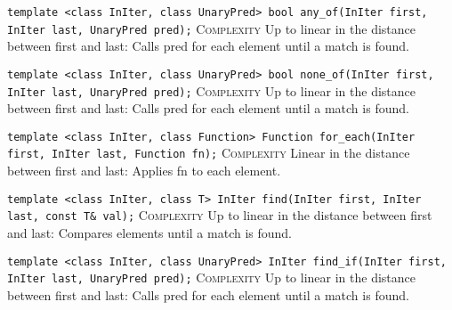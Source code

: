 \noindent{}\hspace*{0.25em}\lstinline[basicstyle=\ttfamily\color{corange}]{template <class InIter, class UnaryPred> bool any_of(InIter first, InIter last, UnaryPred pred);} \textsc{Complexity} Up to linear in the distance between first and last: Calls pred for each element until a match is found.\\\vspace{-0.6em}

\noindent{}\hspace*{0.25em}\lstinline[basicstyle=\ttfamily\color{corange}]{template <class InIter, class UnaryPred> bool none_of(InIter first, InIter last, UnaryPred pred);} \textsc{Complexity} Up to linear in the distance between first and last: Calls pred for each element until a match is found.\\\vspace{-0.6em}

\noindent{}\hspace*{0.25em}\lstinline[basicstyle=\ttfamily\color{corange}]{template <class InIter, class Function> Function for_each(InIter first, InIter last, Function fn);} \textsc{Complexity} Linear in the distance between first and last: Applies fn to each element.\\\vspace{-0.6em}

\noindent{}\hspace*{0.25em}\lstinline[basicstyle=\ttfamily\color{corange}]{template <class InIter, class T> InIter find(InIter first, InIter last, const T& val);} \textsc{Complexity} Up to linear in the distance between first and last: Compares elements until a match is found.\\\vspace{-0.6em}

\noindent{}\hspace*{0.25em}\lstinline[basicstyle=\ttfamily\color{corange}]{template <class InIter, class UnaryPred> InIter find_if(InIter first, InIter last, UnaryPred pred);} \textsc{Complexity} Up to linear in the distance between first and last: Calls pred for each element until a match is found.\\\vspace{-0.6em}

